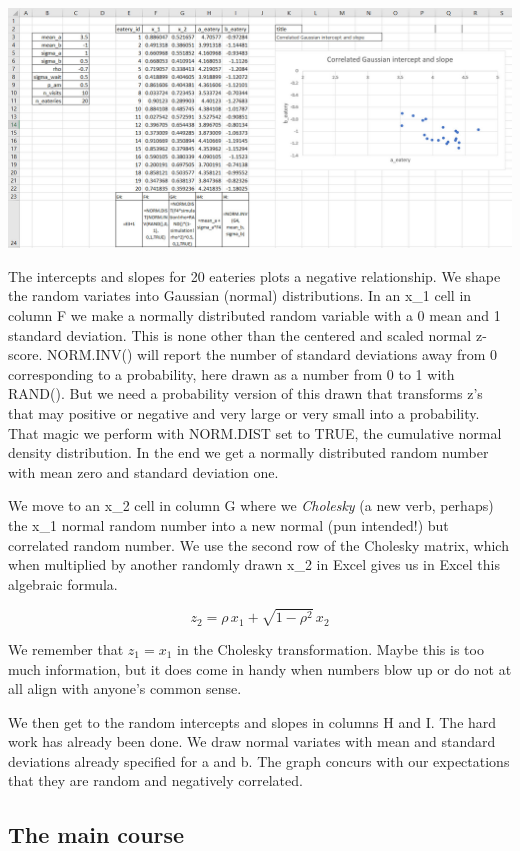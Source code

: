 \documentclass[
]{book}
\begin{document}
\includegraphics{images/05/eatery-a-b.jpg}

The intercepts and slopes for 20 eateries plots a negative relationship. We shape the random variates into Gaussian (normal) distributions. In an x\_1 cell in column F we make a normally distributed random variable with a 0 mean and 1 standard deviation. This is none other than the centered and scaled normal z-score. NORM.INV() will report the number of standard deviations away from 0 corresponding to a probability, here drawn as a number from 0 to 1 with RAND(). But we need a probability version of this drawn that transforms z's that may positive or negative and very large or very small into a probability. That magic we perform with NORM.DIST set to TRUE, the cumulative normal density distribution. In the end we get a normally distributed random number with mean zero and standard deviation one.

We move to an x\_2 cell in column G where we \emph{Cholesky} (a new verb, perhaps) the x\_1 normal random number into a new normal (pun intended!) but correlated random number. We use the second row of the Cholesky matrix, which when multiplied by another randomly drawn x\_2 in Excel gives us in Excel this algebraic formula.

\[
z_2 = \rho \, x_1 + \sqrt{1-\rho^2}\, x_2
\]

We remember that \(z_1 = x_1\) in the Cholesky transformation. Maybe this is too much information, but it does come in handy when numbers blow up or do not at all align with anyone's common sense.

We then get to the random intercepts and slopes in columns H and I. The hard work has already been done. We draw normal variates with mean and standard deviations already specified for a and b. The graph concurs with our expectations that they are random and negatively correlated.

\hypertarget{the-main-course}{%
\subsection{The main course}\label{the-main-course}}
\end{document}
